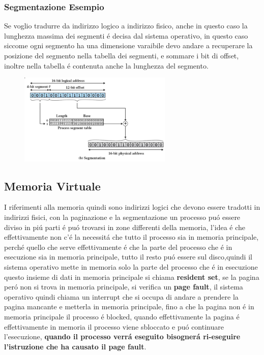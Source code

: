    \subsubsection*{Segmentazione Esempio}
    Se voglio tradurre da indirizzo logico a indirizzo fisico, anche in questo caso la lunghezza massima dei segmenti é
    decisa dal sistema operativo, in questo caso siccome ogni segmento ha una dimensione varaibile devo andare a recuperare
    la posizione del segmento nella tabella dei segmenti, e sommare  i bit di offset, inoltre nella tabella é contenuta
    anche la lunghezza del segmento.
    \begin{figure}[H]
    \centering
    \includegraphics[width=0.65\textwidth]{immagini/indirizzologicosegmentazione}
    \caption{}
    \label{fig:indirizzologicosegmentazione}
    \end{figure}
    \subsection{Memoria Virtuale}
    I riferimenti alla memoria quindi sono indirizzi logici che devono essere tradotti in indirizzi fisici, con
    la paginazione e la segmentazione un processo puó essere diviso in piú parti é puó trovarsi in zone differenti
    della memoria, l'idea é che effettivamente non c'é la necessitá che tutto il processo sia in memoria principale,
    perché quello che serve effettivamente é che la parte del processo che é in esecuzione sia in memoria principale,
    tutto il resto puó essere sul disco,quindi il sistema operativo mette in memoria solo la parte del processo
    che é in esecuzione questo insieme di dati in memoria principale si chiama \textbf{resident set}, se la
    pagina peró non si trova in memoria principale, si verifica un \textbf{page fault}, il sistema operativo
    quindi chiama un interrupt che si occupa di andare a prendere la pagina mancante e metterla in memoria principale,
    fino a che la pagina non é in memoria principale il processo é blocked, quando effettivamente la pagina é effettivamente
    in memoria il processo viene sbloccato e puó continuare l'esecuzione, \textbf{quando il processo verrá eseguito bisognerá
    ri-eseguire l'istruzione che ha causato il page fault}.
